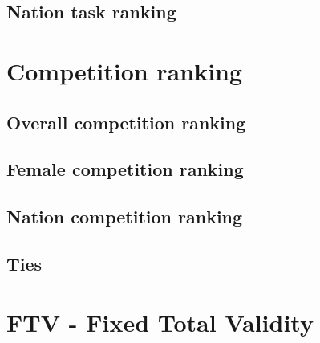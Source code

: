 \documentclass{article}
\begin{document}
\subsection{Nation task ranking}

\newpage
\section{Competition ranking}
\subsection{Overall competition ranking}
\subsection{Female competition ranking}
\subsection{Nation competition ranking}
\subsection{Ties}

\newpage
\section{FTV - Fixed Total Validity}
\end{document}
